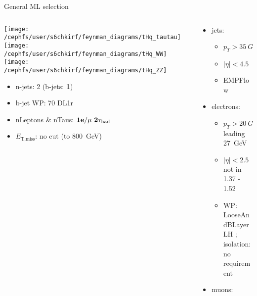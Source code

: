 \begin{frame}{General ML selection}
  \begin{columns}
    \begin{column}{0.5\textwidth}
      \centering \texttt{[image: /cephfs/user/s6chkirf/feynman\_diagrams/tHq\_tautau]}\\
      \texttt{[image: /cephfs/user/s6chkirf/feynman\_diagrams/tHq\_WW]}
      \texttt{[image: /cephfs/user/s6chkirf/feynman\_diagrams/tHq\_ZZ]}
      \begin{itemize}
        \item n-jets: 2 (b-jets: \textbf{1})
        \item b-jet WP: 70 DL1r
        \item nLeptons \& nTaus: $\bf{1e / \mu~2\tau_{\text{had}}} $
        \item $E_{\text{T,miss}}$: no cut (to \SI{800}{GeV})
      \end{itemize}
    \end{column}
    \begin{column}{0.7\textwidth}
      \vspace*{-0.05\textwidth}
      \begin{itemize}
        \footnotesize
        \item jets:
        \vspace*{-0.02\textwidth}
        \begin{itemize}
          \footnotesize
          \item $p_T>\SI{35}{GeV}$
          \item $|\eta|<4.5$
          \item EMPFlow
        \end{itemize}
        \item electrons:
        \vspace*{-0.02\textwidth}
        \begin{itemize}
          \footnotesize
          \item $p_T>\SI{20}{GeV}$ leading \SI{27}{GeV}
          \item $|\eta|<2.5$ not in 1.37 - 1.52
          \item WP: LooseAndBLayerLH ; \\isolation: no requirement
        \end{itemize}
        \item muons:
        \vspace*{-0.02\textwidth}
        \begin{itemize}

\end{itemize}
\end{itemize}
\end{column}
\end{columns}
\end{frame}
